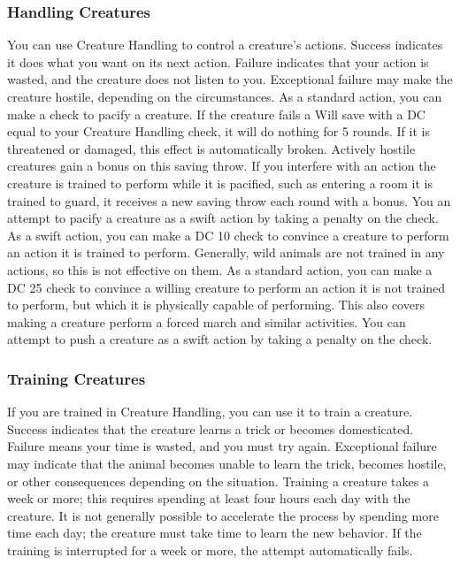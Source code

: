 \subsubsection{Handling Creatures}
You can use Creature Handling to control a creature's actions. Success indicates it does what you want on its next action. Failure indicates that your action is wasted, and the creature does not listen to you. Exceptional failure may make the creature hostile, depending on the circumstances.
 As a standard action, you can make a check to pacify a creature. If the creature fails a Will save with a DC equal to your Creature Handling check, it will do nothing for 5 rounds. If it is threatened or damaged, this effect is automatically broken. Actively hostile creatures gain a  bonus on this saving throw. If you interfere with an action the creature is trained to perform while it is pacified, such as entering a room it is trained to guard, it receives a new saving throw each round with a  bonus. You an attempt to pacify a creature as a swift action by taking a  penalty on the check.
 As a swift action, you can make a DC 10 check to convince a creature to perform an action it is trained to perform. Generally, wild animals are not trained in any actions, so this is not effective on them.
 As a standard action, you can make a DC 25 check to convince a willing creature to perform an action it is not trained to perform, but which it is physically capable of performing. This also covers making a creature perform a forced march and similar activities. You can attempt to push a creature as a swift action by taking a  penalty on the check.

\subsubsection{Training Creatures}
If you are trained in Creature Handling, you can use it to train a creature. Success indicates that the creature learns a trick or becomes domesticated. Failure means your time is wasted, and you must try again. Exceptional failure may indicate that the animal becomes unable to learn the trick, becomes hostile, or other consequences depending on the situation. Training a creature takes a week or more; this requires spending at least four hours each day with the creature. It is not generally possible to accelerate the process by spending more time each day; the creature must take time to learn the new behavior. If the training is interrupted for a week or more, the attempt automatically fails.

